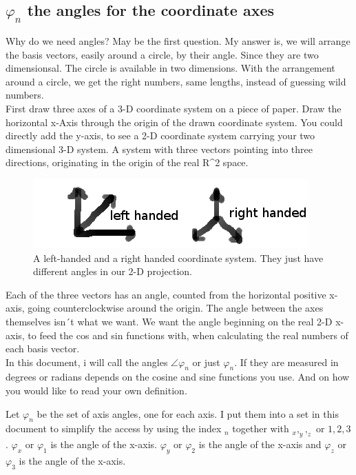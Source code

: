 \documentclass[a4paper]{article}
\begin{document}
\subsection{$\varphi_{n}$ the angles for the coordinate axes}

Why do we need angles? May be the first question. My answer is, we will arrange the basis vectors,
easily around a circle, by their angle. Since they are two dimensionsal. The circle is available in two dimensions.
With the arrangement around a circle, we get the right numbers, same lengths, instead of guessing wild numbers.\\

First draw three axes of a 3-D coordinate system on a piece of paper. Draw the horizontal x-Axis through the origin of the drawn coordinate system. You could directly add the y-axis, to see a 2-D coordinate system carrying your two dimensional 3-D system. A system with three vectors pointing into three directions, originating in the origin of the real R^2 space.\\

\begin{figure}[ht]
\includegraphics{handsystems.png}
\caption{A left-handed and a right handed coordinate system. They just have different angles in our 2-D projection.}
\end{figure}

Each of the three vectors has an angle, counted from the horizontal positive x-axis, going counterclockwise around the origin. The
angle between the axes themselves isn´t what we want. We want the angle beginning on the real 2-D x-axis, to feed the cos and sin functions with, when calculating the real numbers of each basis vector.\\

In this document, i will call the angles $\angle \varphi_{n}$ or just $\varphi_{n}$. If they are measured in degrees or radians depends
on the cosine and sine functions you use. And on how you would like to read your own definition.

Let $\varphi_{n}$ be the set of axis angles, one for each axis. I put them into a set in this document to simplify the access by
using the index $_{n}$ together with $_x, _y, _z$ or $1,2,3$. $\varphi_x$ or $\varphi_1$ is the angle of the x-axis. $\varphi_y$ or $\varphi_2$ is the angle of the x-axis and $\varphi_z$ or $\varphi_3$ is the angle of the x-axis. 
\end{document}
